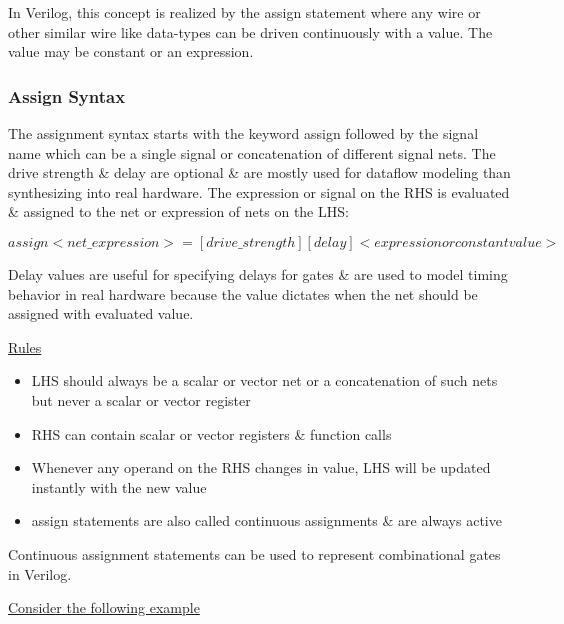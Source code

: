 \documentclass{article}
\begin{document}
	In Verilog, this concept is realized by the assign statement where any wire or other similar wire like data-types can be driven continuously with a value. The value may be constant or an expression.

	\subsubsection{Assign Syntax}

	The assignment syntax starts with the keyword assign followed by the signal name which can be a single signal or concatenation of different signal nets. The drive strength \& delay are optional
	\& are mostly used for dataflow modeling than synthesizing into real hardware. The expression or signal on the RHS is evaluated \& assigned to the net or expression of nets on the LHS:

	\[ assign <net\_expression> = [drive\_strength] [delay] <expression or constant value> \] \newline

	Delay values are useful for specifying delays for gates \& are used to model timing behavior in real hardware because the value dictates when the net should be assigned with evaluated value. \newline \newline

	\underline{Rules} \newline \newline

	\begin{itemize}
		\item LHS should always be a scalar or vector net or a concatenation of such nets but never a scalar or vector register
		\item RHS can contain scalar or vector registers \& function calls
		\item Whenever any operand on the RHS changes in value, LHS will be updated instantly with the new value
		\item assign statements are also called continuous assignments \& are always active
	\end{itemize}

	Continuous assignment statements can be used to represent combinational gates in Verilog. \newline

	\underline{Consider the following example}
\end{document}
